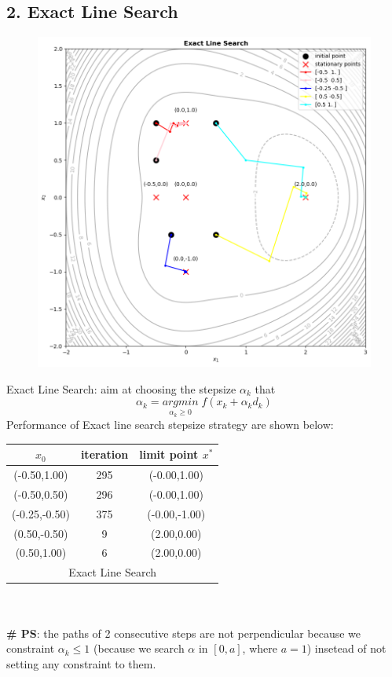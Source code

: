 \documentclass{article}
\newcommand{\subs}[1]{\subsection*{#1}}
\begin{document}
  \endgroup
\newpage
\subs{2. Exact Line Search}

\begingroup
\setlength{\intextsep}{0pt}%
\setlength{\columnsep}{0pt}%
\begin{figure}%
  \centering
  \includegraphics[width=\linewidth]{Exact Line Search.png}
\end{figure}

Exact Line Search: aim at choosing the stepsize $\alpha_k$ that 
\[
\alpha_k = \underset{\alpha_k \geq 0}{argmin}\; f(x_k+\alpha_k d_k)
\]
Performance of Exact line search stepsize strategy are shown below:\\

\noindent\begin{tabular}{ccc}
    
  \hline
  $x_0$ & iteration & limit point $x^*$\\
  \hline
  (-0.50,1.00) & 295 & (-0.00,1.00)   \\ %
  (-0.50,0.50) & 296 & (-0.00,1.00)  \\ %
  (-0.25,-0.50) & 375 & (-0.00,-1.00)  \\ %
  (0.50,-0.50) & 9 & (2.00,0.00) \\ %
  (0.50,1.00) & 6 & (2.00,0.00)  \\ %
        \hline
        \multicolumn{3}{c}{Exact Line Search}\\
        \hline
\end{tabular}\\
\\
\textbf{\# PS}: the paths of 2 consecutive steps are not perpendicular because we constraint $\alpha_k \leq 1$ (because we search $\alpha$ in $[0,a]$, where $a=1$) insetead of not setting any constraint to them.
\end{document}
